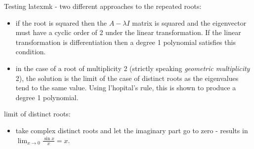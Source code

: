 \documentclass[MathsNotesBase.tex]{subfiles}
\date{\vspace{-6ex}}
\begin{document}
	
	
Testing latexmk - two different approaches to the repeated roots:
	\begin{itemize}
	\item{if the root is squared then the ${ A - \lambda I }$ matrix is squared and the eigenvector must have a cyclic order of 2 under the linear transformation. If the linear transformation is differentiation then a degree 1 polynomial satisfies this condition.}
		\item{in the case of a root of multiplicity 2 (strictly speaking \textit{geometric multiplicity} 2), the solution is the limit of the case of distinct roots as the eigenvalues tend to the same value. Using l'hopital's rule, this is shown to produce a degree 1 polynomial.}
	\end{itemize}

	limit of distinct roots:
	\begin{itemize}
		\item{take complex distinct roots and let the imaginary part go to zero - results in ${ \lim_{x \to 0} \frac{\sin{x}}{x} = x }$.}
	\end{itemize}
	
\end{document}
